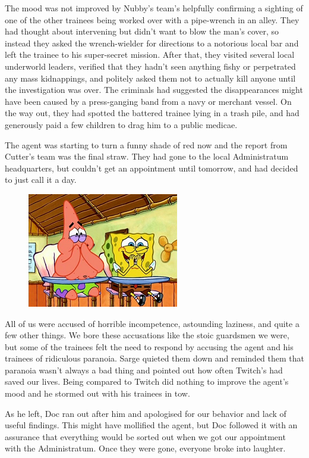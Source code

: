 The mood was not improved by Nubby’s team’s helpfully confirming a sighting of one of the other trainees being worked over with a pipe-wrench in an alley. 
They had thought about intervening but didn’t want to blow the man’s cover, so instead they asked the wrench-wielder for directions to a notorious local bar and left the trainee to his super-secret mission. 
After that, they visited several local underworld leaders, verified that they hadn’t seen anything fishy or perpetrated any mass kidnappings, and politely asked them not to actually kill anyone until the investigation was over. 
The criminals had suggested the disappearances might have been caused by a press-ganging band from a navy or merchant vessel. 
On the way out, they had spotted the battered trainee lying in a trash pile, and had generously paid a few children to drag him to a public medicae.

The agent was starting to turn a funny shade of red now and the report from Cutter’s team was the final straw. 
They had gone to the local Administratum headquarters, but couldn’t get an appointment until tomorrow, and had decided to just call it a day.

\begin{figure}
	\begin{center}
		\includegraphics[width=\figwidth]{pics/8/31.png}
	\end{center}
\end{figure}
All of us were accused of horrible incompetence, astounding laziness, and quite a few other things. 
We bore these accusations like the stoic guardsmen we were, but some of the trainees felt the need to respond by accusing the agent and his trainees of ridiculous paranoia. 
Sarge quieted them down and reminded them that paranoia wasn’t always a bad thing and pointed out how often Twitch’s had saved our lives. 
Being compared to Twitch did nothing to improve the agent’s mood and he stormed out with his trainees in tow.

As he left, Doc ran out after him and apologised for our behavior and lack of useful findings. 
This might have mollified the agent, but Doc followed it with an assurance that everything would be sorted out when we got our appointment with the Administratum. 
Once they were gone, everyone broke into laughter.

